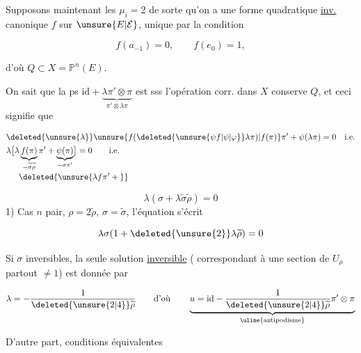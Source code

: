 Supposons maintenant les $\mu_i=2$ de sorte qu'on a une forme quadratique \uline{inv.} canonique $f$ sur $\unsure{E|\mathcal E}$, unique par la condition

\[
f(a_{-1})=0,\qquad f(e_0)=1,
\]

 d'où $Q\subset X=\mathbb P^{n}(E)$.

On sait que la ps  $\mathrm{id}+\underbrace{\lambda\pi'\otimes\pi}_{\pi'\otimes\lambda\pi}$ est   sss l'opération corr. dans $X$ conserve $Q$, et ceci signifie que

\[
\begin{aligned}
&\deleted{\unsure{\lambda}}\unsure{f(\deleted{\unsure{\psi f|\psi|\varphi}}\lambda\pi)|f(\pi)}\pi'+\psi(\lambda\pi)=0\quad\text{i.e.}\\
&\lambda\bigl[\lambda\underbrace{f(\pi)}_{-\widetilde\sigma\widetilde\rho}\pi'+\underbrace{\psi(\pi)}_{-\sigma\pi'}\bigr]=0\qquad\text{i.e.}\\[-2pt]
&\hspace{1.5em}\deleted{\unsure{\lambda f\pi'+{}}}
\end{aligned}
\]

\[
\lambda(\sigma+\lambda\widetilde\sigma\widetilde\rho)=0
\tag*{$(**)$}
\]
1) Cas $n$ pair, $\rho=2\widetilde\rho$, $\sigma=\widetilde\sigma$, l'équation s'écrit

\[
\lambda\sigma(1+\deleted{\unsure{2}}\lambda\widetilde\rho)=0
\]

Si $\sigma$  inversibles, la seule solution \uline{inversible} ( correspondant à une section de $U_\rho$ partout $\ne 1$) est donnée par

\[
\lambda=-\frac{1}{\deleted{\unsure{2|4}}\widetilde\rho}\qquad
\text{d'où}\qquad
\underbrace{u=\mathrm{id}-\frac{1}{\deleted{\unsure{2|4}}\widetilde\rho}\pi'\otimes\pi}_{\text{\uline{antipodisme}}}
\]


D'autre part, conditions équivalentes


